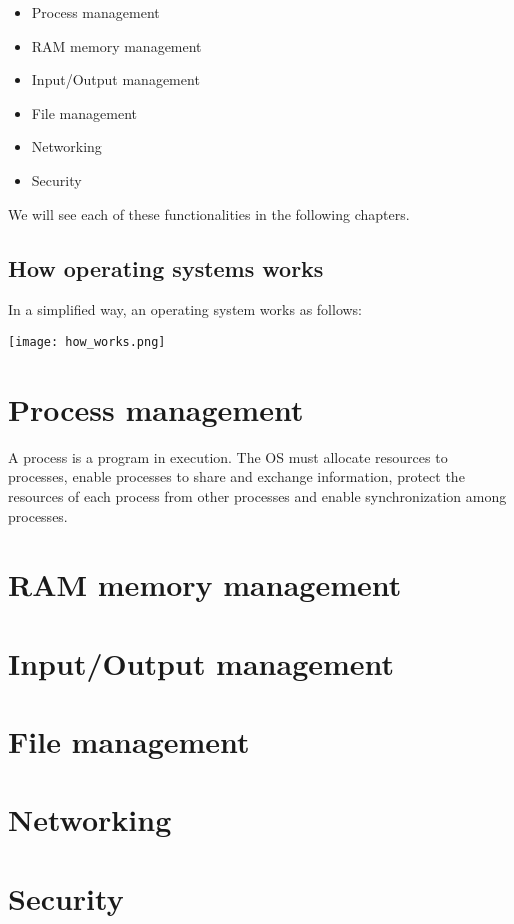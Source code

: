 \begin{itemize}
    \item Process management
    \item RAM memory management
    \item Input/Output management
    \item File management
    \item Networking
    \item Security
\end{itemize}

We will see each of these functionalities in the following chapters.






\section{How operating systems works}

In a simplified way, an operating system works as follows:

\begin{center}
    \texttt{[image: how\_works.png]}
\end{center}





\chapter{Process management}
A process is a program in execution. The OS must allocate resources to processes, enable processes to share and exchange information, protect the resources of each process from other processes and enable synchronization among processes.







\chapter{RAM memory management}



\chapter{Input/Output management}


\chapter{File management}


\chapter{Networking}


\chapter{Security}